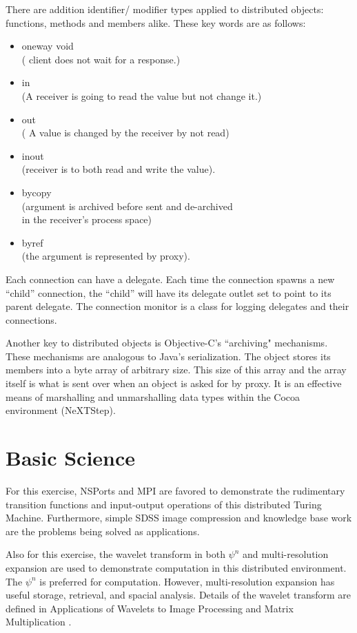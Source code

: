 \documentclass[11pt]{article}
\begin{document}
\begin{Large}
There are addition identifier/ modifier types applied to distributed objects: functions, methods and members alike.  These key words are as follows:
\begin{itemize}
\item oneway void \\ ( client does not wait for a response.)
\item in \\(A receiver is going to read the value but not change it.)
\item out \\( A value is changed by the receiver by not read)
\item inout \\(receiver is to both read and write  the value).
\item bycopy \\(argument is archived before sent and de-archived \\ in the receiver's process space)
\item byref \\(the argument is represented by proxy).   
\end{itemize}


Each connection can have a delegate.  Each time the connection spawns a new ``child'' connection, the ``child'' will have its delegate outlet set to point to its parent delegate. The connection monitor is a class for logging delegates and their connections.  

Another key to distributed objects is Objective-C's ``archiving" mechanisms.  These mechanisms are analogous to Java's serialization.  The object stores its members into a byte array of arbitrary size.  This size of this array and the array itself is what is sent over when an object is asked for by proxy.  It is an effective means of marshalling and unmarshalling data types within the Cocoa environment (NeXTStep).  
\end{Large}

\section {Basic Science}
For this exercise, NSPorts and MPI are favored to demonstrate the rudimentary transition functions and input-output operations of this distributed Turing Machine.  Furthermore, simple SDSS image compression and knowledge base work are the problems being solved as applications.  

Also for this exercise, the wavelet transform in both $\psi^n$ and multi-resolution expansion are used to demonstrate computation in this distributed environment.  The $\psi^n$ is preferred for computation.  However, multi-resolution expansion has useful storage, retrieval, and spacial analysis.  Details of the wavelet transform are defined in Applications of Wavelets to Image Processing and Matrix Multiplication \cite{beatty_wavelets}.  
\end{document}
